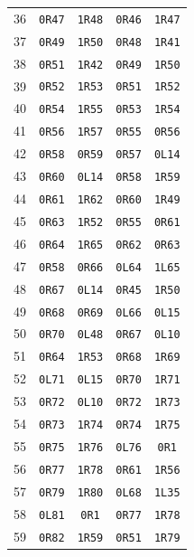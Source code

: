 \begin{longtable}{rcccc}
36 & \texttt{0R47} & \texttt{1R48} & \texttt{0R46} & \texttt{1R47} \\
37 & \texttt{0R49} & \texttt{1R50} & \texttt{0R48} & \texttt{1R41} \\
38 & \texttt{0R51} & \texttt{1R42} & \texttt{0R49} & \texttt{1R50} \\
39 & \texttt{0R52} & \texttt{1R53} & \texttt{0R51} & \texttt{1R52} \\
40 & \texttt{0R54} & \texttt{1R55} & \texttt{0R53} & \texttt{1R54} \\
41 & \texttt{0R56} & \texttt{1R57} & \texttt{0R55} & \texttt{0R56} \\
42 & \texttt{0R58} & \texttt{0R59} & \texttt{0R57} & \texttt{0L14} \\
43 & \texttt{0R60} & \texttt{0L14} & \texttt{0R58} & \texttt{1R59} \\
44 & \texttt{0R61} & \texttt{1R62} & \texttt{0R60} & \texttt{1R49} \\
45 & \texttt{0R63} & \texttt{1R52} & \texttt{0R55} & \texttt{0R61} \\
46 & \texttt{0R64} & \texttt{1R65} & \texttt{0R62} & \texttt{0R63} \\
47 & \texttt{0R58} & \texttt{0R66} & \texttt{0L64} & \texttt{1L65} \\
48 & \texttt{0R67} & \texttt{0L14} & \texttt{0R45} & \texttt{1R50} \\
49 & \texttt{0R68} & \texttt{0R69} & \texttt{0L66} & \texttt{0L15} \\
50 & \texttt{0R70} & \texttt{0L48} & \texttt{0R67} & \texttt{0L10} \\
51 & \texttt{0R64} & \texttt{1R53} & \texttt{0R68} & \texttt{1R69} \\
52 & \texttt{0L71} & \texttt{0L15} & \texttt{0R70} & \texttt{1R71} \\
53 & \texttt{0R72} & \texttt{0L10} & \texttt{0R72} & \texttt{1R73} \\
54 & \texttt{0R73} & \texttt{1R74} & \texttt{0R74} & \texttt{1R75} \\
55 & \texttt{0R75} & \texttt{1R76} & \texttt{0L76} & \texttt{0R1} \\
56 & \texttt{0R77} & \texttt{1R78} & \texttt{0R61} & \texttt{1R56} \\
57 & \texttt{0R79} & \texttt{1R80} & \texttt{0L68} & \texttt{1L35} \\
58 & \texttt{0L81} & \texttt{0R1} & \texttt{0R77} & \texttt{1R78} \\
59 & \texttt{0R82} & \texttt{1R59} & \texttt{0R51} & \texttt{1R79} \\

\end{longtable}
